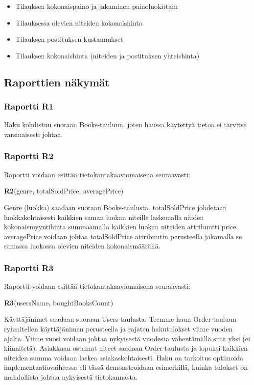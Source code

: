 \documentclass[11pt,a4paper]{article}
\begin{document}
\begin{itemize}
	\item Tilauksen kokonaispaino ja jakaminen painoluokittain
	\item Tilauksessa olevien niteiden kokonaishinta
	\item Tilauksen postituksen kustannukset
	\item Tilauksen kokonaishinta (niteiden ja postituksen yhteishinta)
\end{itemize}

\subsection{Raporttien näkymät}

\subsubsection{Raportti R1}

Haku kohdistuu suoraan Books-tauluun, joten haussa käytettyä tietoa ei tarvitse varsinaisesti johtaa.

\subsubsection{Raportti R2}

Raportti voidaan esittää tietokantakaaviomaisena seuraavasti:

\small{\textbf{R2}(genre, totalSoldPrice, averagePrice)}

Genre (luokka) saadaan suoraan Books-taulusta. totalSoldPrice johdetaan luokkakohtaisesti kaikkien saman luokan niteille laskemalla näiden kokonaismyyntihinta summaamalla kaikkien luokan niteiden attribuutti price. averagePrice voidaan johtaa totalSoldPrice attribuutin perusteella jakamalla se samassa luokassa olevien niteiden kokonaismäärällä.

\subsubsection{Raportti R3}

Raportti voidaan esittää tietokantakaaviomaisena seuraavasti:

\textbf{R3}(usersName, boughtBooksCount)

Käyttäjänimet saadaan suoraan Users-taulusta. Teemme haun Order-tauluun ryhmitellen käyttäjänimen perusteella ja rajaten hakutulokset viime vuoden ajalta. Viime vuosi voidaan johtaa nykyisestä vuodesta vähentämällä siitä yksi (ei kiinnitetä). Asiakkaan ostamat niteet saadaan Order-taulusta ja lopuksi kaikkien niteiden summa voidaan laskea asiakaskohtaisesti. Haku on tarkoitus optimoida implementaatiovaiheessa eli tässä demonstroidaan esimerkillä, kuinka tulokset on mahdollista johtaa nykyisestä tietokannasta.
\end{document}
